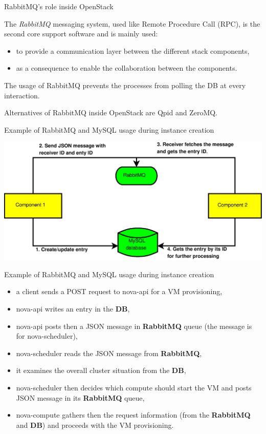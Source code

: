 \documentclass[english,serif,mathserif]{beamer}
\begin{document}
\begin{frame}{RabbitMQ's role inside OpenStack}

The \textit{RabbitMQ} messaging system, used like Remote Procedure Call (RPC),
is the second core support software and is mainly used:

\begin{itemize}
\item to provide a communication layer between the different stack components, 
\item as a consequence to enable the collaboration between the components.
\end{itemize} 

The usage of RabbitMQ prevents the processes from polling the DB at every interaction. 

\vspace{5mm}

Alternatives of RabbitMQ inside OpenStack are Qpid and ZeroMQ.

\end{frame}
\begin{frame}{Example of RabbitMQ and MySQL usage during instance creation}

\includegraphics[scale=0.37]{db-rabbitmq.eps}

\end{frame}
\begin{frame}{Example of RabbitMQ and MySQL usage during instance creation}

\begin{itemize}
\item a client sends a POST request to nova-api for a VM provisioning,
\item nova-api writes an entry in the \textbf{DB},
\item nova-api posts then a JSON message in \textbf{RabbitMQ} queue (the message is for nova-scheduler),
\item nova-scheduler reads the JSON message from \textbf{RabbitMQ},
\item it examines the overall cluster situation from the \textbf{DB},
\item nova-scheduler then decides which compute should start the VM and posts JSON message in its \textbf{RabbitMQ} queue,
\item nova-compute gathers then the request information (from the \textbf{RabbitMQ} and \textbf{DB}) and proceeds with the VM provisioning.
\end{itemize}

\end{frame}
\end{document}
